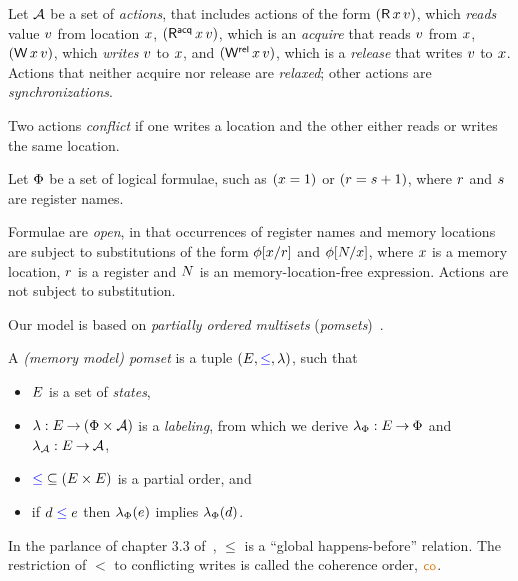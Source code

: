 Let $\mathcal{A}$ be a set of \emph{actions}, that includes actions of the form
$(\DR{\aLoc}{\aVal})$, which \emph{reads} value $v$ from location
$x$, $(\DRAcq{\aLoc}{\aVal})$, which is an \emph{acquire} that reads
$v$ from $x$, $(\DW{\aLoc}{\aVal})$, which \emph{writes} $v$ to
$x$, and $(\DWRel{\aLoc}{\aVal})$, which is a \emph{release} that writes
$v$ to $x$. %
Actions that neither acquire nor release are \emph{relaxed}; other actions
are \emph{synchronizations}. %

Two actions \emph{conflict} if one writes a location and the other
either reads or writes the same location.

Let $\Phi$ be a set of logical formulae, such as $(x=1)$ or
$(r=s+1)$, where $r$ and $s$ are register names.

Formulae are \emph{open}, in that occurrences of register names and memory
locations are subject to substitutions of the form $\phi[x/r]$ and
$\phi[N/x]$, where $x$ is a memory location, $r$ is a
register and $N$ is an memory-location-free expression.  Actions are not
subject to substitution.

Our model is based on \emph{partially ordered multisets} (\emph{pomsets})~\cite{GISCHER1988199}.
\begin{definition}
  \label{def:mmpomset}
  A \emph{(memory model) pomset} is a tuple
  $(\Event, {\le}, %
  \labeling)$, such that
  \begin{itemize}
  \item $E$ is a set of \emph{states},
  \item $\lambda: E \mathbin\rightarrow (\Phi\times\mathcal{A})$ is a \emph{labeling},
    from which we derive $\lambda_{\Phi}:E\mathbin\rightarrow\Phi$ and $\lambda_{\mathcal{A}}:E\mathbin\rightarrow\mathcal{A}$,
  \item ${\mathrel{{\color{blue}\leq}}} \subseteq (E\times E)$ is a partial order, and
  \item if $d\mathrel{{\color{blue}\leq}}e$ then $\lambda_{\Phi}(e)$ implies
    $\lambda_{\Phi}(d)$.
  \end{itemize}
\end{definition}
In the parlance of chapter 3.3 of~\citet{AlglaveThesis}, $\le$ is a ``global
happens-before'' relation.  The restriction of $\lt$ to conflicting writes is
called the coherence order, $\rco$.  

